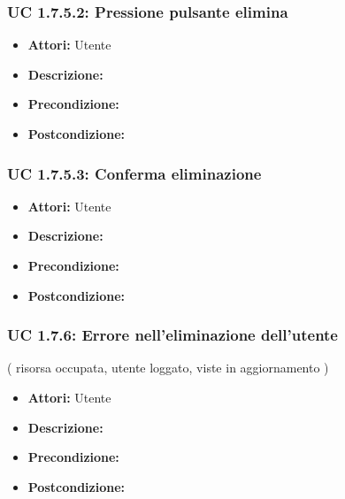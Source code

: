 \subsubsection{UC 1.7.5.2: Pressione pulsante elimina}

\begin{itemize}
\item \textbf{Attori:} Utente
\item \textbf{Descrizione:} 
\item \textbf{Precondizione:} 
\item \textbf{Postcondizione:} 
\end{itemize}

\subsubsection{UC 1.7.5.3: Conferma eliminazione}

\begin{itemize}
\item \textbf{Attori:} Utente
\item \textbf{Descrizione:} 
\item \textbf{Precondizione:} 
\item \textbf{Postcondizione:} 
\end{itemize}

\subsubsection{UC 1.7.6: Errore nell’eliminazione dell'utente}
( risorsa occupata, utente loggato, viste in aggiornamento )

\begin{itemize}
\item \textbf{Attori:} Utente
\item \textbf{Descrizione:} 
\item \textbf{Precondizione:} 
\item \textbf{Postcondizione:} 
\end{itemize}






